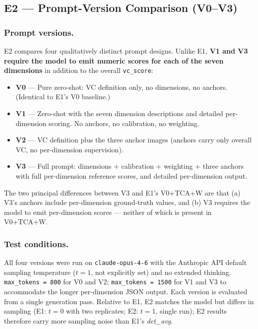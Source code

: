 \subsection{E2 --- Prompt-Version Comparison (V0--V3)}
\label{app:vc-e2}

\subsubsection{Prompt versions.}
E2 compares four qualitatively distinct prompt designs. Unlike E1, \textbf{V1
and V3 require the model to emit numeric scores for each of the seven
dimensions} in addition to the overall \texttt{vc\_score}:

\begin{itemize}
  \item \textbf{V0} --- Pure zero-shot: VC definition only, no dimensions,
    no anchors. (Identical to E1's V0 baseline.)
  \item \textbf{V1} --- Zero-shot with the seven dimension descriptions and
    detailed per-dimension scoring. No anchors, no calibration, no weighting.
  \item \textbf{V2} --- VC definition plus the three anchor images (anchors
    carry only overall VC, no per-dimension supervision).
  \item \textbf{V3} --- Full prompt: dimensions + calibration + weighting +
    three anchors with full per-dimension reference scores, and detailed
    per-dimension output.
\end{itemize}

The two principal differences between V3 and E1's V0+TCA+W are that
(a) V3's anchors include per-dimension ground-truth values, and (b) V3
requires the model to emit per-dimension scores --- neither of which is
present in V0+TCA+W.

\subsubsection{Test conditions.}
All four versions were run on \texttt{claude-opus-4-6} with the Anthropic
API default sampling temperature ($t=1$, not explicitly set) and no extended
thinking. \texttt{max\_tokens = 800} for V0 and V2;
\texttt{max\_tokens = 1500} for V1 and V3 to accommodate the longer
per-dimension JSON output. Each version is evaluated from a single
generation pass. Relative to E1, E2 matches the model but differs in
sampling (E1: $t=0$ with two replicates; E2: $t=1$, single run); E2 results
therefore carry more sampling noise than E1's \emph{det\_avg}.

